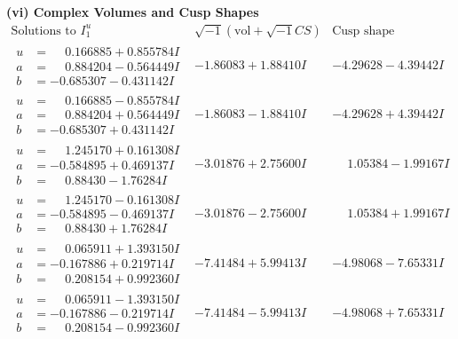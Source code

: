 \documentclass[1p]{elsarticle_modified}
\theoremstyle{definition}
\newcommand{\I}{\sqrt{-1}}
\begin{document}
\newpage\flushleft \textbf{(vi) Complex Volumes and Cusp Shapes}
$$\begin{array}{c|c|c}  
\text{Solutions to }I^u_{1}& \I (\text{vol} + \sqrt{-1}CS) & \text{Cusp shape}\\
 \hline 
\begin{aligned}
u &= \phantom{-}0.166885 + 0.855784 I \\
a &= \phantom{-}0.884204 - 0.564449 I \\
b &= -0.685307 - 0.431142 I\end{aligned}
 & -1.86083 + 1.88410 I & -4.29628 - 4.39442 I \\ \hline\begin{aligned}
u &= \phantom{-}0.166885 - 0.855784 I \\
a &= \phantom{-}0.884204 + 0.564449 I \\
b &= -0.685307 + 0.431142 I\end{aligned}
 & -1.86083 - 1.88410 I & -4.29628 + 4.39442 I \\ \hline\begin{aligned}
u &= \phantom{-}1.245170 + 0.161308 I \\
a &= -0.584895 + 0.469137 I \\
b &= \phantom{-}0.88430 - 1.76284 I\end{aligned}
 & -3.01876 + 2.75600 I & \phantom{-}1.05384 - 1.99167 I \\ \hline\begin{aligned}
u &= \phantom{-}1.245170 - 0.161308 I \\
a &= -0.584895 - 0.469137 I \\
b &= \phantom{-}0.88430 + 1.76284 I\end{aligned}
 & -3.01876 - 2.75600 I & \phantom{-}1.05384 + 1.99167 I \\ \hline\begin{aligned}
u &= \phantom{-}0.065911 + 1.393150 I \\
a &= -0.167886 + 0.219714 I \\
b &= \phantom{-}0.208154 + 0.992360 I\end{aligned}
 & -7.41484 + 5.99413 I & -4.98068 - 7.65331 I \\ \hline\begin{aligned}
u &= \phantom{-}0.065911 - 1.393150 I \\
a &= -0.167886 - 0.219714 I \\
b &= \phantom{-}0.208154 - 0.992360 I\end{aligned}
 & -7.41484 - 5.99413 I & -4.98068 + 7.65331 I \\ \hline\begin{aligned}

\end{aligned}
\end{array}$$
\end{document}

